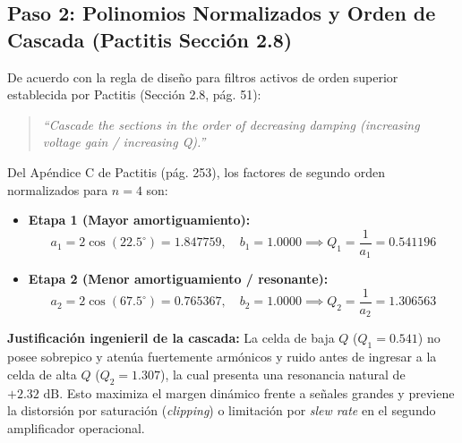 \documentclass[a4paper,11pt]{article}
\begin{document}
\subsection{Paso 2: Polinomios Normalizados y Orden de Cascada (Pactitis Sección 2.8)}
De acuerdo con la regla de diseño para filtros activos de orden superior establecida por Pactitis (Sección 2.8, pág. 51):
\begin{quote}
\textit{``Cascade the sections in the order of decreasing damping (increasing voltage gain / increasing Q).''}
\end{quote}
Del Apéndice C de Pactitis (pág. 253), los factores de segundo orden normalizados para $n=4$ son:
\begin{itemize}
    \item \textbf{Etapa 1 (Mayor amortiguamiento):}
    \begin{equation}
    a_1 = 2\cos(22.5^\circ) = \mathbf{1.847759}, \quad b_1 = 1.0000 \implies Q_1 = \frac{1}{a_1} = \mathbf{0.541196}
    \end{equation}
    \item \textbf{Etapa 2 (Menor amortiguamiento / resonante):}
    \begin{equation}
    a_2 = 2\cos(67.5^\circ) = \mathbf{0.765367}, \quad b_2 = 1.0000 \implies Q_2 = \frac{1}{a_2} = \mathbf{1.306563}
    \end{equation}
\end{itemize}
\noindent\textbf{Justificación ingenieril de la cascada:} La celda de baja $Q$ ($Q_1 = 0.541$) no posee sobrepico y atenúa fuertemente armónicos y ruido antes de ingresar a la celda de alta $Q$ ($Q_2 = 1.307$), la cual presenta una resonancia natural de $+2.32\text{ dB}$. Esto maximiza el margen dinámico frente a señales grandes y previene la distorsión por saturación (\textit{clipping}) o limitación por \textit{slew rate} en el segundo amplificador operacional.
\end{document}

